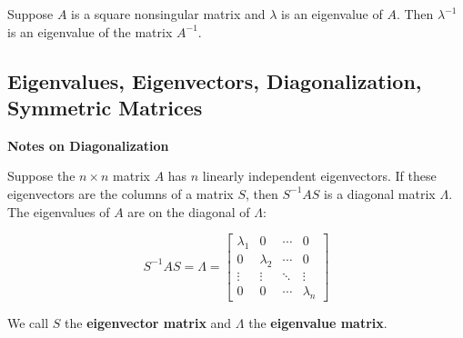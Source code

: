 \documentclass{article}
\begin{document}
Suppose \(A\) is a square nonsingular matrix and \(\lambda\) is an eigenvalue of \(A\). Then \(\lambda^{-1}\) is an eigenvalue of the matrix \(A^{-1}\).

\subsection{Eigenvalues, Eigenvectors, Diagonalization, Symmetric Matrices}

\textbf{Notes on Diagonalization}

Suppose the \(n \times n\) matrix \(A\) has \(n\) linearly independent eigenvectors. If these eigenvectors are the columns of a matrix \(S\), then \(S^{-1}AS\) is a diagonal matrix \(\Lambda\). The eigenvalues of \(A\) are on the diagonal of \(\Lambda\):

\[
S^{-1}AS = \Lambda = \begin{bmatrix}
   \lambda_1       & 0  & \cdots  & 0  \\
  0  & \lambda_2 & \cdots  & 0 \\
  \vdots  & \vdots  & \ddots & \vdots \\
   0  & 0 & \cdots & \lambda_n
\end{bmatrix}
\]

We call \(S\) the \textbf{eigenvector matrix} and \(\Lambda\) the \textbf{eigenvalue matrix}.
\end{document}
